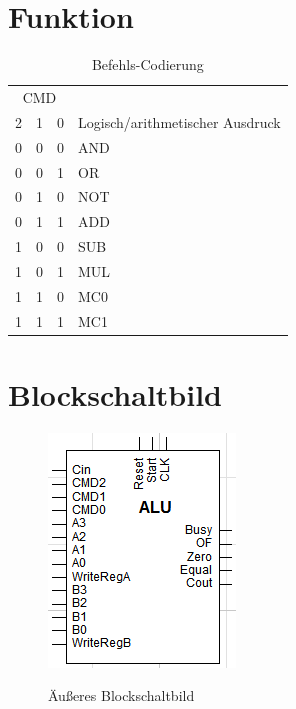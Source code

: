 \documentclass[11pt]{report}
\begin{document}
	\section{Funktion}
	\begin{table}[h]
		\centering
		\label{codierungstabelle}
		\begin{tabular}{|lll|l|}
			\hline
			\multicolumn{3}{|c|}{CMD}                            & \multicolumn{1}{c|}{}             \\
			\multicolumn{1}{|l|}{2} & \multicolumn{1}{l|}{1} & 0 & Logisch/arithmetischer Ausdruck \\ \hline
			0                       & 0                      & 0 & AND                               \\ \hline
			0                       & 0                      & 1 & OR                                \\ \hline
			0                       & 1                      & 0 & NOT                               \\ \hline
			0                       & 1                      & 1 & ADD                               \\ \hline
			1                       & 0                      & 0 & SUB                               \\ \hline
			1                       & 0                      & 1 & MUL                               \\ \hline
			1                       & 1                      & 0 & MC0                               \\ \hline
			1                       & 1                      & 1 & MC1                               \\ \hline
		\end{tabular}
		\caption{Befehls-Codierung}
	\end{table}
	
	
	
	\section{Blockschaltbild}
	\begin{figure}[htbp]
		\begin{center}
			\includegraphics[]{aeusseresBlockschaltbild}
			\label{aeusseresBlockschaltbild}
			\caption{Äußeres Blockschaltbild}
		\end{center}
	\end{figure}
	
\end{document}
